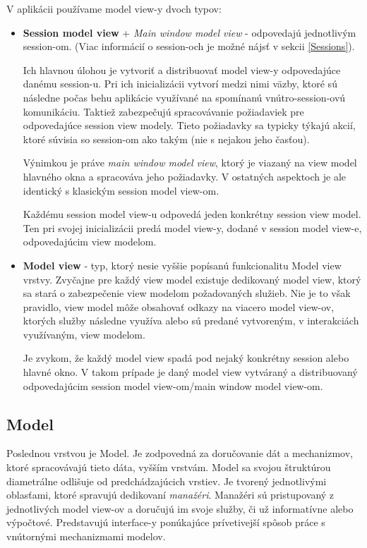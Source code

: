 V aplikácii používame model view-y dvoch typov:
\begin{itemize}
    \item \textbf{Session model view} + \textit{Main window model view}  - odpovedajú jednotlivým session-om. (Viac informácií o session-och je možné nájsť v sekcii \ref{Sessions}). 
    
    Ich hlavnou úlohou je vytvoriť a distribuovať model view-y odpovedajúce danému session-u. Pri ich inicializácii vytvorí medzi nimi väzby, ktoré sú následne počas behu aplikácie využívané na spomínanú vnútro-session-ovú komunikáciu. Taktiež zabezpečujú spracovávanie požiadaviek pre odpovedajúce session view modely. Tieto požiadavky sa typicky týkajú akcií, ktoré súvisia so session-om ako takým (nie s nejakou jeho časťou).  
    
    Výnimkou je práve \textit{main window model view}, ktorý je viazaný na view model hlavného okna a spracováva jeho požiadavky. V ostatných aspektoch je ale identický s klasickým session model view-om.
    
    Každému session model view-u odpovedá jeden konkrétny session view model. Ten pri svojej inicializácii predá model view-y, dodané v session model view-e, odpovedajúcim view modelom.   
    \item \textbf{Model view} - typ, ktorý nesie vyššie popísanú funkcionalitu Model view vrstvy. Zvyčajne pre každý view model existuje dedikovaný model view, ktorý sa stará o zabezpečenie view modelom požadovaných služieb. Nie je to však pravidlo, view model môže obsahovať odkazy na viacero model view-ov, ktorých služby následne využíva alebo sú predané vytvoreným, v interakciách využívaným, view modelom.

    Je zvykom, že každý model view spadá pod nejaký konkrétny session alebo hlavné okno. V takom prípade je daný model view vytváraný a distribuovaný odpovedajúcim session model view-om/main window model view-om.  
\end{itemize}

\subsection{Model}\label{model}

Poslednou  vrstvou je Model. Je zodpovedná za doručovanie dát a mechanizmov, ktoré spracovávajú tieto dáta, vyšším vrstvám. Model sa svojou štruktúrou diametrálne odlišuje od predchádzajúcich vrstiev. Je tvorený jednotlivými oblasťami, ktoré spravujú dedikovaní \textit{manažéri}. Manažéri sú pristupovaný z jednotlivých model view-ov a doručujú im svoje služby, či už informatívne alebo výpočtové. Predstavujú interface-y ponúkajúce prívetivejší spôsob práce s vnútornými mechanizmami modelov. 

